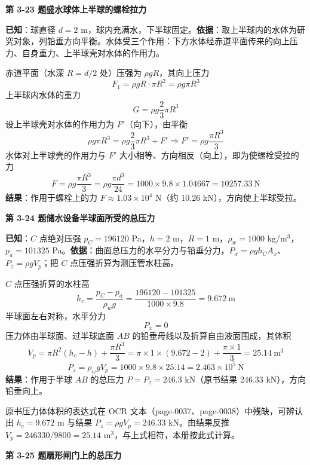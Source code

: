 \noindent\textbf{第 3-23 题\quad 盛水球体上半球的螺栓拉力}

\begin{jie}
\textbf{已知}：球直径 $d=2$ m，球内充满水，下半球固定。\textbf{依据}：取上半球内的水体为研究对象，列铅垂方向平衡。水体受三个作用：下方水体经赤道平面传来的向上压力、自身重力、上半球壳对水体的作用力。

赤道平面（水深 $R=d/2$ 处）压强为 $\rho gR$，其向上压力
\[ F_1=\rho gR\cdot\pi R^2=\rho g\pi R^3 \]
上半球内水体的重力
\[ G=\rho g\frac{2}{3}\pi R^3 \]
设上半球壳对水体的作用力为 $F'$（向下），由平衡
\[ \rho g\pi R^3=\rho g\frac{2}{3}\pi R^3+F'\Rightarrow F'=\rho g\frac{\pi R^3}{3} \]
水体对上半球壳的作用力与 $F'$ 大小相等、方向相反（向上），即为使螺栓受拉的力
\[ F=\rho g\frac{\pi R^3}{3}=\rho g\frac{\pi d^3}{24}=1000\times9.8\times1.04667=10257.33\ \mathrm{N} \]
\textbf{结果}：作用于螺栓上的力 $F\approx1.03\times10^4$ N（约 10.26 kN），方向使上半球受拉。
\end{jie}

\noindent\textbf{第 3-24 题\quad 储水设备半球面所受的总压力}

\begin{jie}
\textbf{已知}：$C$ 点绝对压强 $p_C=196120$ Pa，$h=2$ m，$R=1$ m，$\rho_w=1000$ kg/m$^3$，$p_a=101325$ Pa。\textbf{依据}：曲面总压力的水平分力与铅垂分力，$P_x=\rho gh_CA_x$、$P_z=\rho gV_p$；把 $C$ 点压强折算为测压管水柱高。

$C$ 点压强折算的水柱高
\[ h_c=\frac{p_C-p_a}{\rho_wg}=\frac{196120-101325}{1000\times9.8}=9.672\ \mathrm{m} \]
半球面左右对称，水平分力
\[ P_x=0 \]
压力体由半球面、过半球底面 $AB$ 的铅垂母线以及折算自由液面围成，其体积
\[ V_p=\pi R^2(h_c-h)+\frac{\pi R^3}{3}=\pi\times1\times(9.672-2)+\frac{\pi\times1}{3}=25.14\ \mathrm{m^3} \]
\[ P_z=\rho_wgV_p=1000\times9.8\times25.14=2.463\times10^5\ \mathrm{N} \]
\textbf{结果}：作用于半球 $AB$ 的总压力 $P=P_z=246.3$ kN（原书结果 246.33 kN），方向铅垂向上。
\end{jie}

\begin{tishi}
原书压力体体积的表达式在 OCR 文本（page-0037、page-0038）中残缺，可辨认出 $h_c=9.672$ m 与结果 $P_z=\rho gV_p=246.33$ kN。由结果反推 $V_p=246330/9800=25.14$ m$^3$，与上式相符，本册按此式计算。
\end{tishi}

\noindent\textbf{第 3-25 题\quad 扇形闸门上的总压力}


